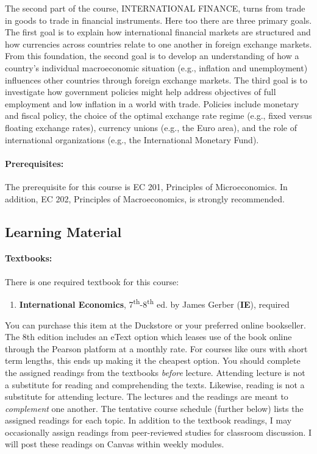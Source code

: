 \documentclass[10pt]{article}
\begin{document}
\noindent The second part of the course, INTERNATIONAL FINANCE, turns from trade in goods to trade in financial instruments.  Here too there are three primary goals.  The first goal is to explain how international financial markets are structured and how currencies across countries relate to one another in foreign exchange markets.  From this foundation, the second goal is to develop an understanding of how a country's individual macroeconomic situation (e.g., inflation and unemployment) influences other countries through foreign exchange markets.  The third goal is to investigate how government policies might help address objectives of full employment and low inflation in a world with trade.  Policies include monetary and fiscal policy, the choice of the optimal exchange rate regime (e.g., fixed versus floating exchange rates), currency unions (e.g., the Euro area), and the role of international organizations (e.g., the International Monetary Fund).   

\paragraph{Prerequisites:} The prerequisite for this course is EC 201, Principles of Microeconomics.  In addition, EC 202, Principles of Macroeconomics, is strongly recommended. 

\newpage

\subsection*{Learning Material}

\paragraph{Textbooks:} There is one required textbook for this course:

\begin{enumerate}
	\item {\textbf{International Economics}, 7\textsuperscript{th}-8\textsuperscript{th} ed.} by James Gerber (\textbf{IE}), required
\end{enumerate}
You can purchase this item at the Duckstore or your preferred online bookseller.
The 8th edition includes an eText option which leases use of the book online through the Pearson platform at a monthly rate.
For courses like ours with short term lengths, this ends up making it the cheapest option.  
You should complete the assigned readings from the textbooks \textit{before} lecture. Attending lecture is not a substitute for reading and comprehending the texts. Likewise, reading is not a substitute for attending lecture. The lectures and the readings are meant to \textit{complement} one another. The tentative course schedule (further below) lists the assigned readings for each topic.
In addition to the textbook readings, I may occasionally assign readings from peer-reviewed studies for classroom discussion. I will post these readings on Canvas within weekly modules.
\end{document}
